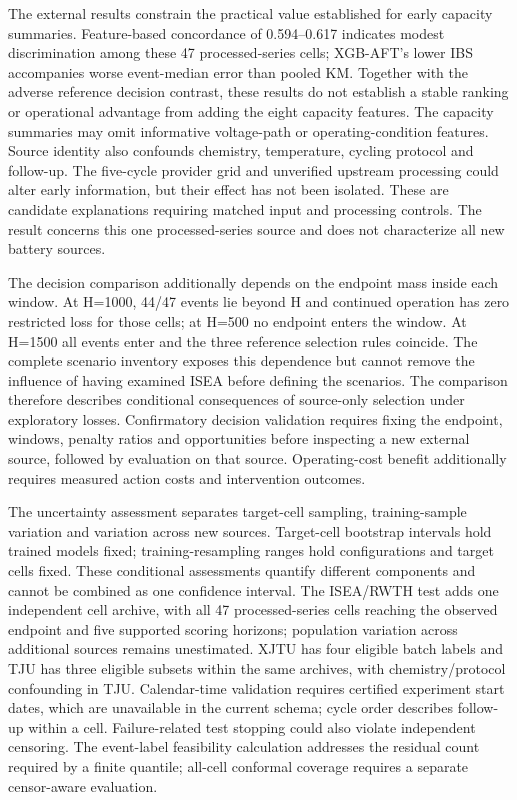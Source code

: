 \documentclass[preprint,12pt]{elsarticle}
\begin{document}
The external results constrain the practical value established for early capacity summaries. Feature-based concordance of 0.594--0.617 indicates modest discrimination among these 47 processed-series cells; XGB-AFT's lower IBS accompanies worse event-median error than pooled KM. Together with the adverse reference decision contrast, these results do not establish a stable ranking or operational advantage from adding the eight capacity features. The capacity summaries may omit informative voltage-path or operating-condition features. Source identity also confounds chemistry, temperature, cycling protocol and follow-up. The five-cycle provider grid and unverified upstream processing could alter early information, but their effect has not been isolated. These are candidate explanations requiring matched input and processing controls. The result concerns this one processed-series source and does not characterize all new battery sources.

The decision comparison additionally depends on the endpoint mass inside each window. At H=1000, 44/47 events lie beyond H and continued operation has zero restricted loss for those cells; at H=500 no endpoint enters the window. At H=1500 all events enter and the three reference selection rules coincide. The complete scenario inventory exposes this dependence but cannot remove the influence of having examined ISEA before defining the scenarios. The comparison therefore describes conditional consequences of source-only selection under exploratory losses. Confirmatory decision validation requires fixing the endpoint, windows, penalty ratios and opportunities before inspecting a new external source, followed by evaluation on that source. Operating-cost benefit additionally requires measured action costs and intervention outcomes.

The uncertainty assessment separates target-cell sampling, training-sample variation and variation across new sources. Target-cell bootstrap intervals hold trained models fixed; training-resampling ranges hold configurations and target cells fixed. These conditional assessments quantify different components and cannot be combined as one confidence interval. The ISEA/RWTH test adds one independent cell archive, with all 47 processed-series cells reaching the observed endpoint and five supported scoring horizons; population variation across additional sources remains unestimated. XJTU has four eligible batch labels and TJU has three eligible subsets within the same archives, with chemistry/protocol confounding in TJU. Calendar-time validation requires certified experiment start dates, which are unavailable in the current schema; cycle order describes follow-up within a cell. Failure-related test stopping could also violate independent censoring. The event-label feasibility calculation addresses the residual count required by a finite quantile; all-cell conformal coverage requires a separate censor-aware evaluation.
\end{document}
